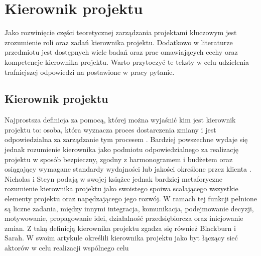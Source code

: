 \newpage
\section{Kierownik projektu}
Jako rozwinięcie części teoretycznej zarządzania projektami kluczowym jest zrozumienie roli oraz zadań kierownika projektu. Dodatkowo w literaturze przedmiotu jest dostępnych wiele badań oraz prac omawiających cechy oraz kompetencje kierownika projektu. Warto przytoczyć te teksty w celu udzielenia trafniejszej odpowiedzi na postawione w pracy pytanie.
\\
\subsection{Kierownik projektu}
Najprostsza definicja za pomocą, której można wyjaśnić kim jest kierownik projektu to: osoba, która wyznacza proces dostarczenia zmiany i jest odpowiedzialna za zarządzanie tym procesem \autocite{Turner2016}.
Bardziej powszechne wydaje się jednak rozumienie kierownika jako podmiotu odpowiedzialnego za realizację projektu w sposób bezpieczny, zgodny z harmonogramem i budżetem oraz osiągający wymagane standardy wydajności lub jakości określone przez klienta \autocite{Sommerville}.
Nicholas i Steyn podają w swojej książce jednak bardziej metaforyczne rozumienie kierownika projektu jako swoistego spoiwa scalającego wszystkie elementy projektu oraz napędzającego jego rozwój. W ramach tej funkcji pełnione są liczne zadania, między innymi integracja, komunikacja, podejmowanie decyzji, motywowanie, propagowanie idei, działalność przedsiębiorcza oraz inicjowanie zmian. \autocite{NicholasSteyn}
Z taką definicją kierownika projektu zgadza się również Blackburn i Sarah. W swoim artykule określili kierownika projektu jako byt łączący sieć aktorów w celu realizacji wspólnego celu \autocite{BlackburnSarah}

